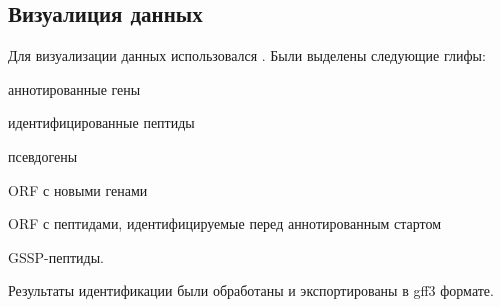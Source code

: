 \subsection{Визуалиция данных}
Для визуализации данных использовался . Были выделены следующие глифы: 
\begin{inparaenum}
    \item аннотированные гены
    \item идентифицированные пептиды
    \item псевдогены
    \item ORF с новыми генами
    \item ORF с пептидами, идентифицируемые перед аннотированным стартом
    \item GSSP-пептиды.
\end{inparaenum} Результаты идентификации были обработаны и экспортированы в gff3 формате.


\newpage



